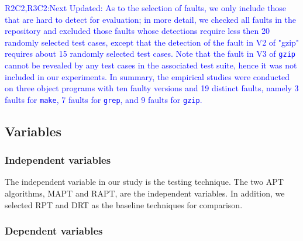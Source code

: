 \documentclass[10pt,journal,compsoc]{IEEEtran}
\begin{document}

\textcolor{blue}{R2C2,R3C2:Next Updated: As to the selection of faults, we only include those that are hard to detect for evaluation; in more detail, we checked all faults in the repository and excluded those faults whose detections require less then 20 randomly selected test cases, except that the detection of the fault in V2 of "gzip" requires about 15 randomly selected test cases. Note that the fault in V3 of \texttt{gzip} cannot be revealed by any test cases in the associated test suite, hence it was not included in our experiments.
In summary, the empirical studies were conducted on three object programs with ten faulty versions and 19 distinct faults, namely 3 faults for \texttt{make}, 7 faults for \texttt{grep}, and 9 faults for \texttt{gzip}.}

\subsection{Variables}

\subsubsection{Independent variables}
The independent variable in our study is the testing technique. The two APT algorithms, MAPT and RAPT, are the independent variables. In addition, we selected RPT and DRT as the baseline techniques for comparison.

\subsubsection{Dependent variables}
\end{document}
